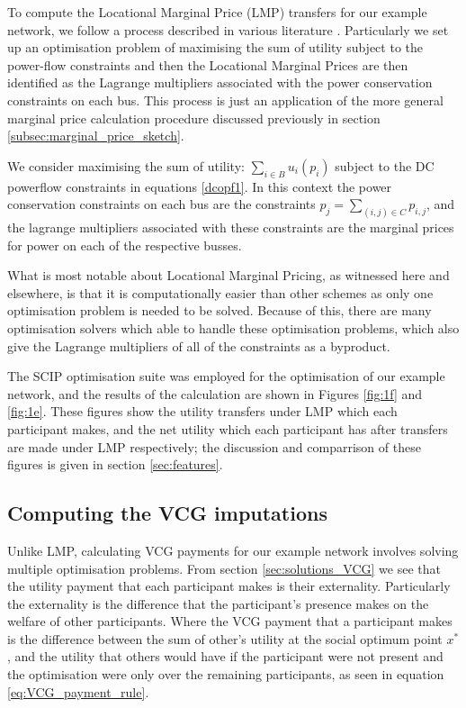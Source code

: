To compute the Locational Marginal Price (LMP) transfers for our example network, we follow a process described in various literature \cite{lmp1,lmp2}.
Particularly we set up an optimisation problem of maximising the sum of utility subject to the power-flow constraints and then the Locational Marginal Prices are then identified as the Lagrange multipliers associated with the power conservation constraints on each bus.
This process is just an application of the more general marginal price calculation procedure discussed previously in section \ref{subsec:marginal_price_sketch}.

We consider maximising the sum of utility: $\sum_{i\in B} u_i(p_i)$ subject to the DC powerflow constraints in equations \ref{dcopf1}.
In this context the power conservation constraints on each bus are the constraints $p_j = \sum_{(i,j)\in C}p_{i,j}$, and the lagrange multipliers associated with these constraints are the marginal prices for power on each of the respective busses.

What is most notable about Locational Marginal Pricing, as witnessed here and elsewhere, is that it is computationally easier than other schemes as only one optimisation problem is needed to be solved.
Because of this, there are many optimisation solvers which able to handle these optimisation problems, which also give the Lagrange multipliers of all of the constraints as a byproduct.

The SCIP optimisation suite \cite{MaherFischerGallyetal.2017} was employed for the optimisation of our example network, and the results of the calculation are shown in Figures \ref{fig:1f} and \ref{fig:1e}.
These figures show the utility transfers under LMP which each participant makes, and the net utility which each participant has after transfers are made under LMP respectively; the discussion and comparrison of these figures is given in section \ref{sec:features}.

\subsection{Computing the VCG imputations}\label{subsec:VCG_compute1}

Unlike LMP, calculating VCG payments for our example network involves solving multiple optimisation problems.
From section \ref{sec:solutions_VCG} we see that the utility payment that each participant makes is their externality.
Particularly the externality is the difference that the participant's presence makes on the welfare of other participants.
Where the VCG payment that a participant makes is the difference between the sum of other's utility at the social optimum point $x^*$, and the utility that others would have if the participant were not present and the optimisation were only over the remaining participants, as seen in equation \ref{eq:VCG_payment_rule}.

